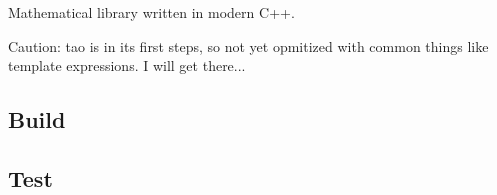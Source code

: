 Mathematical library written in modern C++.

Caution\+: tao is in its first steps, so not yet opmitized with common things like template expressions. I will get there...

\subsection*{Build}


\begin{DoxyCode}{0}
\end{DoxyCode}


\subsection*{Test}


\begin{DoxyCode}{0}
\end{DoxyCode}
 